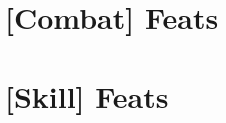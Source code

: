 \section{[Combat] Feats} \label{feats:combat}

\begin{multicols}{2}



\end{multicols}

\section{[Skill] Feats}

\begin{multicols}{2}



\end{multicols}